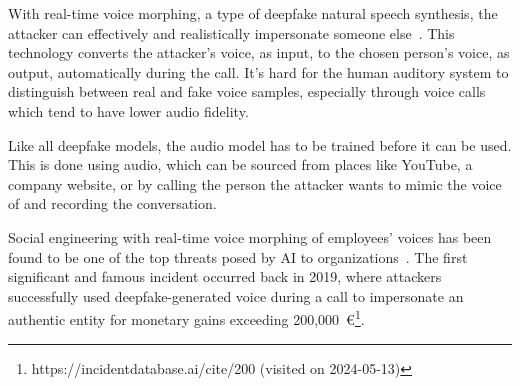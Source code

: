 %
%
With real-time voice morphing, a type of deepfake natural speech synthesis, the attacker can effectively and realistically impersonate someone else~\citep{doan_BTSE_Audio_Deepfake_Detection_2023}. This technology converts the attacker's voice, as input, to the chosen person's voice, as output, automatically during the call. It's hard for the human auditory system to distinguish between real and fake voice samples, especially through voice calls which tend to have lower audio fidelity.



%
%
Like all deepfake models, the audio model has to be trained before it can be used. This is done using audio, which can be sourced from places like YouTube, a company website, or by calling the person the attacker wants to mimic the voice of and recording the conversation.



%
%
Social engineering with real-time voice morphing of employees' voices has been found to be one of the top threats posed by AI to organizations~\citep{mirsky_Threat_Offensive_AI_Organizations_2023}. The first significant and famous incident occurred back in 2019, where attackers successfully used deepfake-generated voice during a call to impersonate an authentic entity for monetary gains exceeding 200,000~€\footnote{https://incidentdatabase.ai/cite/200 (visited on 2024-05-13)}.
